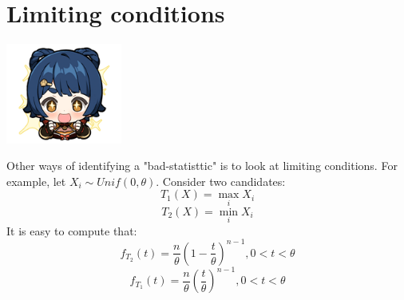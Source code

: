 \documentclass[oneside]{book}
\begin{document}
\section{Limiting conditions}
\begin{marginfigure}%
    \includegraphics[width=1.5in]{chibis/file_015.png}
\end{marginfigure}%
Other ways of identifying a "bad-statisttic" is to look at limiting conditions. For example, let $X_i\sim Unif(0,\theta)$. Consider two candidates:
$$T_1(X)=\max_i X_i$$
$$T_2(X)=\min_i X_i$$
It is easy to compute that:
$$f_{T_2}(t)=\frac{n}{\theta}\left(1-\frac{t}{\theta}\right)^{n-1},0<t<\theta$$
$$f_{T_1}(t)=\frac{n}{\theta}\left(\frac{t}{\theta}\right)^{n-1},0<t<\theta$$
\end{document}
